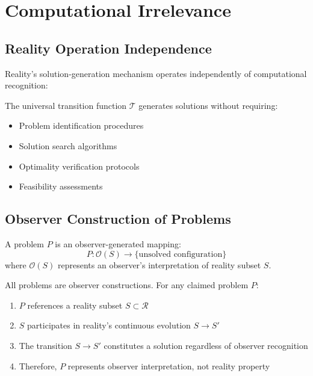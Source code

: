 \documentclass{article}
\begin{document}
\section{Computational Irrelevance}

\subsection{Reality Operation Independence}
Reality's solution-generation mechanism operates independently of computational recognition:

\begin{proposition}
The universal transition function $\mathcal{T}$ generates solutions without requiring:
\begin{itemize}
    \item Problem identification procedures
    \item Solution search algorithms  
    \item Optimality verification protocols
    \item Feasibility assessments
\end{itemize}
\end{proposition}

\subsection{Observer Construction of Problems}
\begin{definition}
A problem $P$ is an observer-generated mapping:
$$P: \mathcal{O}(S) \rightarrow \{\text{unsolved configuration}\}$$
where $\mathcal{O}(S)$ represents an observer's interpretation of reality subset $S$.
\end{definition}

\begin{theorem}
All problems are observer constructions. For any claimed problem $P$:
\begin{enumerate}
    \item $P$ references a reality subset $S \subset \mathcal{R}$
    \item $S$ participates in reality's continuous evolution $S \rightarrow S'$  
    \item The transition $S \rightarrow S'$ constitutes a solution regardless of observer recognition
    \item Therefore, $P$ represents observer interpretation, not reality property
\end{enumerate}
\end{theorem}
\end{document}
